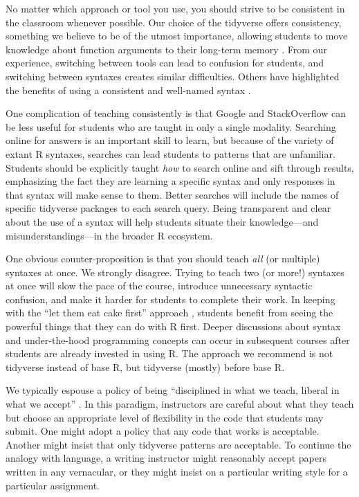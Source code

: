 \documentclass[12pt]{article}
\begin{document}
No matter which approach or tool you use, you should strive to be
consistent in the classroom whenever possible. Our choice of the
tidyverse offers consistency, something we believe to be of the utmost
importance, allowing students to move knowledge about function arguments
to their long-term memory \citep{mcnamaraetal2021a}. From our
experience, switching between tools can lead to confusion for students,
and switching between syntaxes creates similar difficulties. Others have
highlighted the benefits of using a consistent and well-named syntax
\citep{Pruim2017, gehrke2021}.

One complication of teaching consistently is that Google and
StackOverflow can be less useful for students who are taught in only a
single modality. Searching online for answers is an important skill to
learn, but because of the variety of extant R syntaxes, searches can
lead students to patterns that are unfamiliar. Students should be
explicitly taught \emph{how} to search online and sift through results,
emphasizing the fact they are learning a specific syntax and only
responses in that syntax will make sense to them. Better searches will
include the names of specific tidyverse packages to each search query.
Being transparent and clear about the use of a syntax will help students
situate their knowledge---and misunderstandings---in the broader R
ecosystem.

One obvious counter-proposition is that you should teach \emph{all} (or
multiple) syntaxes at once. We strongly disagree. Trying to teach two
(or more!) syntaxes at once will slow the pace of the course, introduce
unnecessary syntactic confusion, and make it harder for students to
complete their work. In keeping with the ``let them eat cake first''
approach \citep{cetinkaya2020fresh, wang2017}, students benefit from
seeing the powerful things that they can do with R first. Deeper
discussions about syntax and under-the-hood programming concepts can
occur in subsequent courses after students are already invested in using
R. The approach we recommend is not tidyverse instead of base R, but
tidyverse (mostly) before base R.

We typically espouse a policy of being ``disciplined in what we teach,
liberal in what we accept'' \citep{postel1980dod}. In this paradigm,
instructors are careful about what they teach but choose an appropriate
level of flexibility in the code that students may submit. One might
adopt a policy that any code that works is acceptable. Another might
insist that only tidyverse patterns are acceptable. To continue the
analogy with language, a writing instructor might reasonably accept
papers written in any vernacular, or they might insist on a particular
writing style for a particular assignment.
\end{document}
